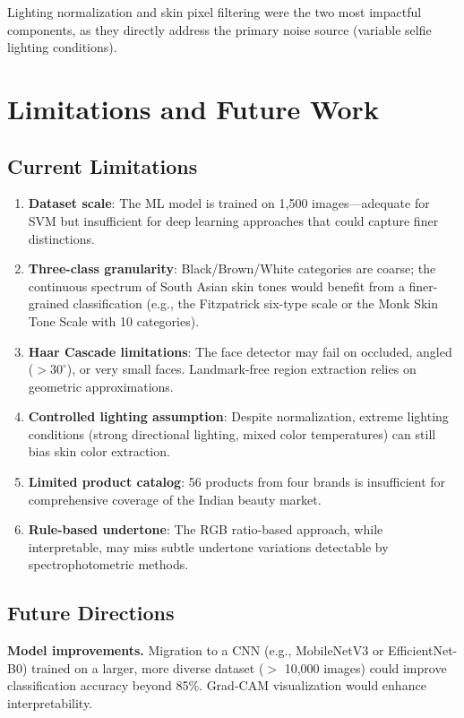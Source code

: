 \documentclass[conference]{IEEEtran}
\begin{document}
Lighting normalization and skin pixel filtering were the two most impactful components, as they directly address the primary noise source (variable selfie lighting conditions).

\section{Limitations and Future Work}

\subsection{Current Limitations}

\begin{enumerate}
    \item \textbf{Dataset scale}: The ML model is trained on 1,500 images---adequate for SVM but insufficient for deep learning approaches that could capture finer distinctions.
    \item \textbf{Three-class granularity}: Black/Brown/White categories are coarse; the continuous spectrum of South Asian skin tones would benefit from a finer-grained classification (e.g., the Fitzpatrick six-type scale or the Monk Skin Tone Scale with 10 categories).
    \item \textbf{Haar Cascade limitations}: The face detector may fail on occluded, angled ($> 30^{\circ}$), or very small faces. Landmark-free region extraction relies on geometric approximations.
    \item \textbf{Controlled lighting assumption}: Despite normalization, extreme lighting conditions (strong directional lighting, mixed color temperatures) can still bias skin color extraction.
    \item \textbf{Limited product catalog}: 56 products from four brands is insufficient for comprehensive coverage of the Indian beauty market.
    \item \textbf{Rule-based undertone}: The RGB ratio-based approach, while interpretable, may miss subtle undertone variations detectable by spectrophotometric methods.
\end{enumerate}

\subsection{Future Directions}

\textbf{Model improvements.} Migration to a CNN (e.g., MobileNetV3 or EfficientNet-B0) trained on a larger, more diverse dataset ($>$ 10,000 images) could improve classification accuracy beyond 85\%. Grad-CAM visualization would enhance interpretability.
\end{document}
